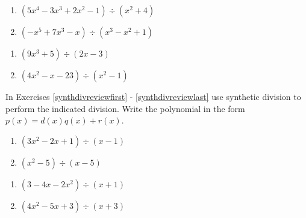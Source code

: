 \begin{multicols}{2}
\begin{enumerate}
\setcounter{enumi}{\value{HW}}

\item $\left(5x^{4} - 3x^{3} + 2x^{2} - 1 \right) \div \left(x^{2} + 4 \right)$
\item $\left(-x^{5} + 7x^{3} - x \right) \div \left(x^{3} - x^{2} + 1 \right)$

\setcounter{HW}{\value{enumi}}
\end{enumerate}
\end{multicols}

\begin{multicols}{2}
\begin{enumerate}
\setcounter{enumi}{\value{HW}}

\item $\left(9x^{3} + 5 \right) \div \left(2x - 3 \right)$
\item $\left(4x^2 - x - 23 \right) \div \left(x^{2} - 1 \right)$ \label{polydivreviewlast}

\setcounter{HW}{\value{enumi}}
\end{enumerate}
\end{multicols}

In Exercises \ref{synthdivreviewfirst} - \ref{synthdivreviewlast} use synthetic division to perform the indicated division.  Write the polynomial in the form $p(x) = d(x)q(x) + r(x)$.

\begin{multicols}{2}
\begin{enumerate}
\setcounter{enumi}{\value{HW}}

\item $\left(3x^2-2x+1 \right) \div \left(x-1\right)$ \label{synthdivreviewfirst}
\item $\left(x^2-5 \right) \div \left(x-5\right)$

\setcounter{HW}{\value{enumi}}
\end{enumerate}
\end{multicols}

\begin{multicols}{2}
\begin{enumerate}
\setcounter{enumi}{\value{HW}}

\item $\left(3-4x-2x^2 \right) \div \left(x+1\right)$
\item $\left(4x^2-5x +3\right) \div \left(x+3\right)$

\setcounter{HW}{\value{enumi}}
\end{enumerate}
\end{multicols}

